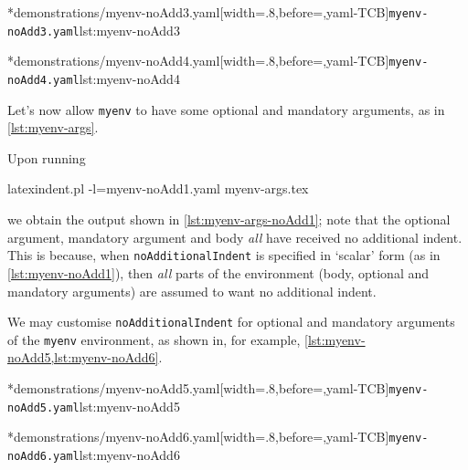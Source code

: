 	\begin{minipage}{.45\textwidth}
		\cmhlistingsfromfile[style=yaml-LST]*{demonstrations/myenv-noAdd3.yaml}[width=.8\linewidth,before=\centering,yaml-TCB]{\texttt{myenv-noAdd3.yaml}}{lst:myenv-noAdd3}
	\end{minipage}
	\hfill
	\begin{minipage}{.45\textwidth}
		\cmhlistingsfromfile[style=yaml-LST]*{demonstrations/myenv-noAdd4.yaml}[width=.8\linewidth,before=\centering,yaml-TCB]{\texttt{myenv-noAdd4.yaml}}{lst:myenv-noAdd4}
	\end{minipage}


	Let's now allow \texttt{myenv} to have some optional and mandatory arguments, as in
	\cref{lst:myenv-args}.


	Upon running
	\begin{commandshell}
latexindent.pl -l=myenv-noAdd1.yaml myenv-args.tex  
\end{commandshell}
	we obtain the output shown in \cref{lst:myenv-args-noAdd1}; note that the optional
	argument, mandatory argument and body \emph{all} have received no additional indent. This
	is because, when \texttt{noAdditionalIndent} is specified in `scalar' form (as in
	\cref{lst:myenv-noAdd1}), then \emph{all} parts of the environment (body, optional and
	mandatory arguments) are assumed to want no additional indent.

	We may customise \texttt{noAdditionalIndent} for optional and mandatory arguments of the
	\texttt{myenv} environment, as shown in, for example,
	\cref{lst:myenv-noAdd5,lst:myenv-noAdd6}.

	\begin{minipage}{.49\textwidth}
		\cmhlistingsfromfile[style=yaml-LST]*{demonstrations/myenv-noAdd5.yaml}[width=.8\linewidth,before=\centering,yaml-TCB]{\texttt{myenv-noAdd5.yaml}}{lst:myenv-noAdd5}
	\end{minipage}
	\hfill
	\begin{minipage}{.49\textwidth}
		\cmhlistingsfromfile[style=yaml-LST]*{demonstrations/myenv-noAdd6.yaml}[width=.8\linewidth,before=\centering,yaml-TCB]{\texttt{myenv-noAdd6.yaml}}{lst:myenv-noAdd6}
	\end{minipage}

